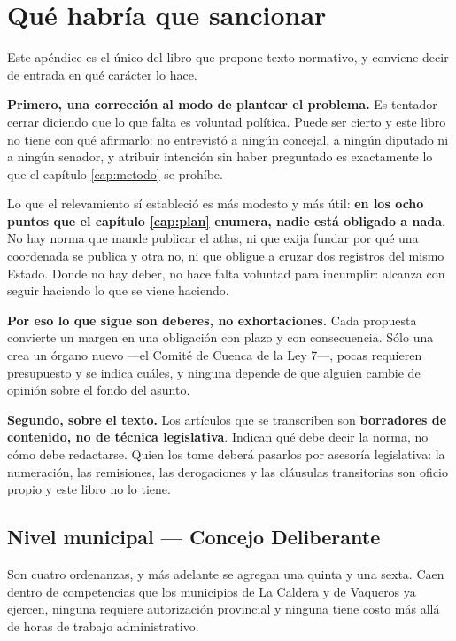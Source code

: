 \chapter{Qué habría que sancionar}
\label{cap:propuestas}

Este apéndice es el único del libro que propone texto normativo, y conviene decir de entrada
en qué carácter lo hace.

\begin{cautela}
\textbf{Primero, una corrección al modo de plantear el problema.} Es tentador cerrar diciendo
que lo que falta es voluntad política. Puede ser cierto y este libro no tiene con qué
afirmarlo: no entrevistó a ningún concejal, a ningún diputado ni a ningún senador, y atribuir
intención sin haber preguntado es exactamente lo que el capítulo \ref{cap:metodo} se prohíbe.

Lo que el relevamiento sí estableció es más modesto y más útil: \textbf{en los ocho puntos
que el capítulo \ref{cap:plan} enumera, nadie está obligado a nada}. No hay norma que mande
publicar el atlas, ni que exija fundar por qué una coordenada se publica y otra no, ni que
obligue a cruzar dos registros del mismo Estado. Donde no hay deber, no hace falta voluntad
para incumplir: alcanza con seguir haciendo lo que se viene haciendo.

\textbf{Por eso lo que sigue son deberes, no exhortaciones.} Cada propuesta convierte un
margen en una obligación con plazo y con consecuencia. Sólo una crea un órgano nuevo ---el Comité de Cuenca de la Ley 7---, pocas requieren presupuesto y se indica cuáles, y ninguna depende de que alguien cambie de
opinión sobre el fondo del asunto.

\textbf{Segundo, sobre el texto.} Los artículos que se transcriben son \textbf{borradores de
contenido, no de técnica legislativa}. Indican qué debe decir la norma, no cómo debe
redactarse. Quien los tome deberá pasarlos por asesoría legislativa: la numeración, las
remisiones, las derogaciones y las cláusulas transitorias son oficio propio y este libro no lo
tiene.
\end{cautela}

\section{Nivel municipal --- Concejo Deliberante}

Son cuatro ordenanzas, y más adelante se agregan una quinta y una sexta. Caen dentro de competencias que los municipios de La Caldera
y de Vaqueros ya ejercen, ninguna requiere autorización provincial y ninguna tiene costo más
allá de horas de trabajo administrativo.

